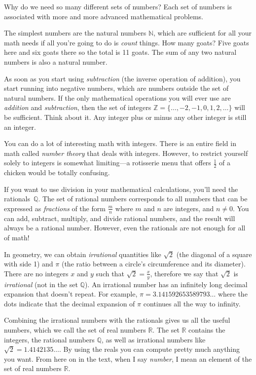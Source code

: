 		\noindent
		Why do we need so many different sets of numbers?
		Each set of numbers is associated with more and more advanced mathematical problems.

		The simplest numbers are the natural numbers $\mathbb{N}$,
		which are sufficient for all your math needs if all you're going to do is \emph{count} things.
		How many goats? Five goats here and six goats there so the total is 11 goats. 
		The sum of any two natural numbers is also a natural number.

		As soon as you start using \emph{subtraction} (the inverse operation of addition),
		you start running into negative numbers,
		which are numbers outside the set of natural numbers.
		If the only mathematical operations you will ever use are \emph{addition} and \emph{subtraction},
		then the set of integers $\mathbb{Z} = \{ \ldots, -2, -1, 0, 1, 2, \ldots \}$ will be sufficient.
		Think about it.
		Any integer plus or minus any other integer is still an integer.

		You can do a lot of interesting math with integers.
		There is an entire field in math called \emph{number theory} that deals with integers.
		However, to restrict yourself solely to integers is somewhat limiting---a rotisserie
		menu that offers $\frac{1}{2}$ of a chicken would be totally confusing.

		If you want to use division in your mathematical calculations,														
		you'll need the rationals~$\mathbb{Q}$.
		The set of rational numbers corresponds to all numbers that can be expressed as \emph{fractions} of the form $\frac{m}{n}$		
		where $m$ and $n$ are integers, and $n \neq 0$.
		You can add, subtract, multiply, and divide rational numbers, and the result will always be a rational number.
		However, even the rationals are not enough for all of math!

		In geometry, we can obtain \emph{irrational} quantities like $\sqrt{2}$ (the diagonal of a square with side 1)
		and $\pi$ (the ratio between a circle's circumference and its diameter).
		There are no integers $x$ and $y$ such that $\sqrt{2}=\frac{x}{y}$,
		therefore we say that $\sqrt{2}$ is \emph{irrational} (not in the set $\mathbb{Q}$).
		An irrational number has an infinitely long decimal expansion that doesn't repeat.
		For example, $\pi = 3.141592653589793\ldots$ where the dots indicate
		that the decimal expansion of $\pi$ continues all the way to infinity.

		Combining the irrational numbers with the rationals gives us all the useful numbers,
		which we call the set of real numbers $\mathbb{R}$.
		The set $\mathbb{R}$ contains the integers,
		the rational numbers $\mathbb{Q}$,
		as well as irrational numbers like $\sqrt{2}=1.4142135\ldots$.
		By using the reals you can compute pretty much anything you want.
		From here on in the text, when I say \emph{number},
		I mean an element of the set of real numbers $\mathbb{R}$.

